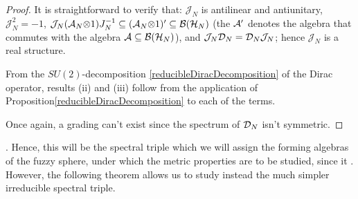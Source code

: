\begin{proof}
It is straightforward to verify that: $\mathcal J_N$ is antilinear and antiunitary, $\mathcal J_N^2 = - 1$, $\mathcal J_N (\mathcal A_N \mathcal\otimes 1) J_N^{-1} \subseteq (\mathcal A_N \mathcal\otimes 1)' \subseteq \mathcal B(\mathcal H_N)$ (the $\mathcal A '$ denotes the algebra that commutes with the algebra $\mathcal A \subseteq \mathcal B(\mathcal H_N)$), and $\mathcal J_N \mathcal D_N = \mathcal D_N \mathcal J_N$; hence $\mathcal J_N$ is a real structure.

From the $SU(2)$-decomposition \eqref{reducibleDiracDecomposition} of the Dirac operator, results (ii) and (iii) follow from the application of Proposition\ref{reducibleDiracDecomposition} to each of the terms.

Once again, a grading can't exist since the spectrum of $\mathcal D_N$ isn't symmetric.
\end{proof}

. { \color{gray}
} Hence, this will be the spectral triple which we will assign the forming algebras of the fuzzy sphere, under which the metric properties are to be studied, since it . However, the following theorem allows us to study instead the much simpler irreducible spectral triple.

